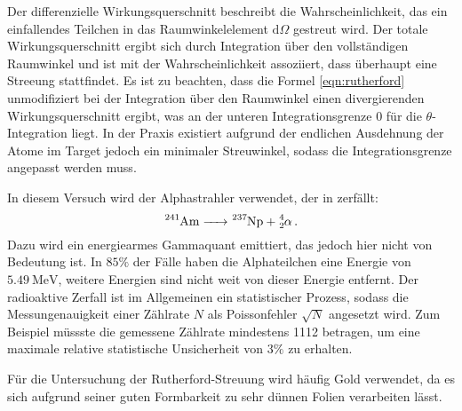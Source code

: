 Der differenzielle Wirkungsquerschnitt beschreibt die Wahrscheinlichkeit, das ein einfallendes Teilchen in das Raumwinkelelement $\mathrm{d} \Omega$ gestreut wird. Der totale Wirkungsquerschnitt ergibt sich durch Integration über den vollständigen Raumwinkel und ist mit der Wahrscheinlichkeit assoziiert, dass überhaupt eine Streeung stattfindet. Es ist zu beachten, dass die Formel \eqref{eqn:rutherford} unmodifiziert bei der Integration über den Raumwinkel einen divergierenden Wirkungsquerschnitt ergibt, was an der unteren Integrationsgrenze $0$ für die $\theta$-Integration liegt. In der Praxis existiert aufgrund der endlichen Ausdehnung der Atome im Target jedoch ein minimaler Streuwinkel, sodass die Integrationsgrenze angepasst werden muss.

In diesem Versuch wird der Alphastrahler  verwendet, der in  zerfällt:
\begin{equation*}
  \ce{^{241}Am -> ^{237}Np + ^4_2} \alpha\,.
\end{equation*}
Dazu wird ein energiearmes Gammaquant emittiert, das jedoch hier nicht von Bedeutung ist. In $85\%$ der Fälle haben die Alphateilchen eine Energie von $\SI{5.49}{\mega\electronvolt}$, weitere Energien sind nicht weit von dieser Energie entfernt. Der radioaktive Zerfall ist im Allgemeinen ein statistischer Prozess, sodass die Messungenauigkeit einer Zählrate $N$ als Poissonfehler $\sqrt{N}$ angesetzt wird. Zum Beispiel müssste die gemessene Zählrate mindestens 1112 betragen, um eine maximale relative statistische Unsicherheit von $3\%$ zu erhalten.

Für die Untersuchung der Rutherford-Streuung wird häufig Gold verwendet, da es sich aufgrund seiner guten Formbarkeit zu sehr dünnen Folien verarbeiten lässt.

